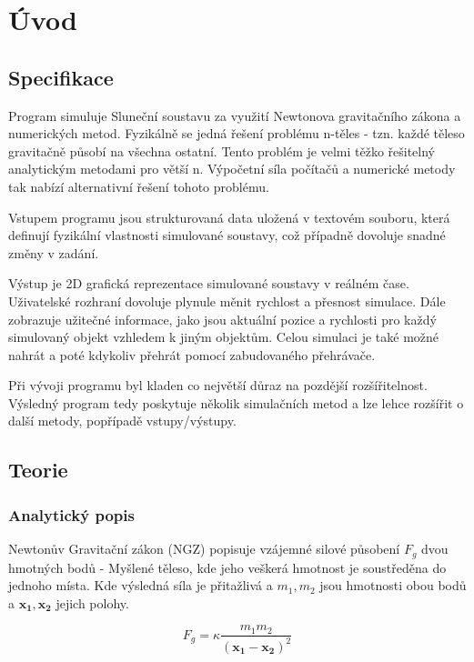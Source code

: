 
\chapter{Úvod}
\label{chap:uvod}

\setcounter{page}{1}
\section{Specifikace}
Program simuluje Sluneční soustavu za využití Newtonova gravitačního zákona a numerických metod. Fyzikálně se jedná řešení problému n-těles - tzn. každé těleso gravitačně působí na všechna ostatní. Tento problém je velmi těžko řešitelný analytickým metodami pro větší n. Výpočetní síla počítačů a numerické metody tak nabízí alternativní řešení tohoto problému.

Vstupem programu jsou strukturovaná data uložená v textovém souboru, která definují fyzikální vlastnosti simulované soustavy, což případně dovoluje snadné změny v zadání. 

Výstup je 2D grafická reprezentace simulované soustavy v reálném čase. Uživatelské rozhraní dovoluje plynule měnit rychlost a přesnost simulace. Dále zobrazuje užitečné informace, jako jsou aktuální pozice a rychlosti pro každý simulovaný objekt vzhledem k jiným objektům. Celou simulaci je také možné nahrát a poté kdykoliv přehrát pomocí zabudovaného přehrávače.

Při vývoji programu byl kladen co největší důraz na pozdější rozšířitelnost. Výsledný program tedy poskytuje několik simulačních metod a lze lehce rozšířit o další metody, popřípadě vstupy/výstupy.

\section{Teorie}
\subsection{Analytický popis}
Newtonův Gravitační zákon (NGZ) popisuje vzájemné silové působení $ {F}_g $ dvou hmotných bodů - Myšlené těleso, kde jeho veškerá hmotnost je soustředěna do jednoho místa. Kde výsledná síla je přitažlivá a $ m_1,m_2 $ jsou hmotnosti obou bodů a $ \boldsymbol{x_1,x_2} $ jejich polohy.

\begin{equation}
	{F}_g= \kappa \dfrac{m_1 m_2}{(\boldsymbol{x_1 - x_2})^2} 
\end{equation}



